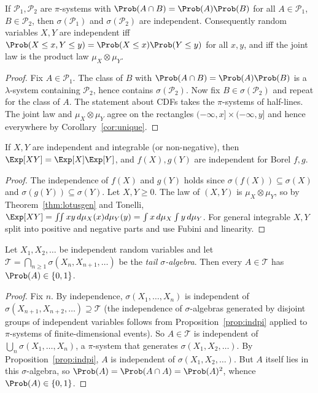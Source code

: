 \begin{proposition}\label{prop:indpi}
If $\mathcal P_1,\mathcal P_2$ are $\pi$-systems with $\Prob(A\cap B)=\Prob(A)\Prob(B)$ for all
$A\in\mathcal P_1$, $B\in\mathcal P_2$, then $\sigma(\mathcal P_1)$ and $\sigma(\mathcal P_2)$ are
independent. Consequently random variables $X,Y$ are independent iff
$\Prob(X\le x,Y\le y)=\Prob(X\le x)\Prob(Y\le y)$ for all $x,y$, and iff the joint law is the
product law $\mu_X\otimes\mu_Y$.
\end{proposition}
\begin{proof}
Fix $A\in\mathcal P_1$. The class of $B$ with $\Prob(A\cap B)=\Prob(A)\Prob(B)$ is a
$\lambda$-system containing $\mathcal P_2$, hence contains $\sigma(\mathcal P_2)$. Now fix
$B\in\sigma(\mathcal P_2)$ and repeat for the class of $A$. The statement about CDFs takes
the $\pi$-systems of half-lines. The joint law and $\mu_X\otimes\mu_Y$ agree on the
rectangles $(-\infty,x]\times(-\infty,y]$ and hence everywhere by
Corollary~\ref{cor:unique}.
\end{proof}

\begin{theorem}\label{thm:indprod}
If $X,Y$ are independent and integrable (or non-negative), then $\Exp[XY]=\Exp[X]\Exp[Y]$,
and $f(X),g(Y)$ are independent for Borel $f,g$.
\end{theorem}
\begin{proof}
The independence of $f(X)$ and $g(Y)$ holds since $\sigma(f(X))\subseteq\sigma(X)$ and
$\sigma(g(Y))\subseteq\sigma(Y)$. Let $X,Y\ge0$. The law of $(X,Y)$ is $\mu_X\otimes\mu_Y$, so
by Theorem~\ref{thm:lotusgen} and Tonelli,
$\Exp[XY]=\iint xy\,d\mu_X(x)d\mu_Y(y)=\int x\,d\mu_X\int y\,d\mu_Y$. For general integrable $X,Y$
split into positive and negative parts and use Fubini and linearity.
\end{proof}

\begin{theorem}\label{thm:kolmogorov01}
Let $X_1,X_2,\dots$ be independent random variables and let
$\mathcal T=\bigcap_{n\ge1}\sigma(X_n,X_{n+1},\dots)$ be the \emph{tail $\sigma$-algebra}. Then
every $A\in\mathcal T$ has $\Prob(A)\in\{0,1\}$.
\end{theorem}
\begin{proof}
Fix $n$. By independence, $\sigma(X_1,\dots,X_n)$ is independent of
$\sigma(X_{n+1},X_{n+2},\dots)\supseteq\mathcal T$ (the independence of $\sigma$-algebras
generated by disjoint groups of independent variables follows from
Proposition~\ref{prop:indpi} applied to $\pi$-systems of finite-dimensional events). So $A\in\mathcal T$ is independent of
$\bigcup_n\sigma(X_1,\dots,X_n)$, a $\pi$-system that generates $\sigma(X_1,X_2,\dots)$. By
Proposition~\ref{prop:indpi}, $A$ is independent of $\sigma(X_1,X_2,\dots)$. But $A$ itself lies
in this $\sigma$-algebra, so $\Prob(A)=\Prob(A\cap A)=\Prob(A)^2$, whence $\Prob(A)\in\{0,1\}$.
\end{proof}

